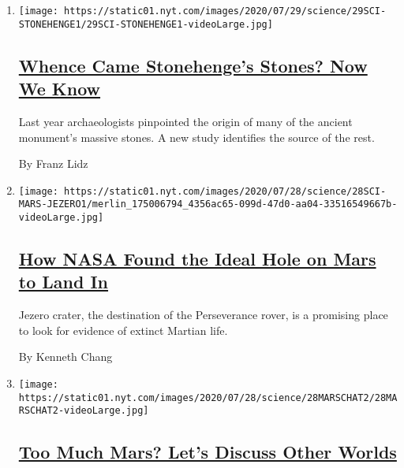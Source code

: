 \begin{enumerate}
\def\labelenumi{\arabic{enumi}.}
\item
  \texttt{[image: https://static01.nyt.com/images/2020/07/29/science/29SCI-STONEHENGE1/29SCI-STONEHENGE1-videoLarge.jpg]}

  \hypertarget{whence-came-stonehenges-stones-now-we-know}{%
  \subsection{\texorpdfstring{\href{/2020/07/29/science/stonehenge-archaeology-sarsens.html}{Whence
  Came Stonehenge's Stones? Now We
  Know}}{Whence Came Stonehenge's Stones? Now We Know}}\label{whence-came-stonehenges-stones-now-we-know}}

  Last year archaeologists pinpointed the origin of many of the ancient
  monument's massive stones. A new study identifies the source of the
  rest.

  By Franz Lidz
\item
  \texttt{[image: https://static01.nyt.com/images/2020/07/28/science/28SCI-MARS-JEZERO1/merlin\_175006794\_4356ac65-099d-47d0-aa04-33516549667b-videoLarge.jpg]}

  \hypertarget{how-nasa-found-the-ideal-hole-on-mars-to-land-in}{%
  \subsection{\texorpdfstring{\href{/2020/07/28/science/nasa-jezero-perseverance.html}{How
  NASA Found the Ideal Hole on Mars to Land
  In}}{How NASA Found the Ideal Hole on Mars to Land In}}\label{how-nasa-found-the-ideal-hole-on-mars-to-land-in}}

  Jezero crater, the destination of the Perseverance rover, is a
  promising place to look for evidence of extinct Martian life.

  By Kenneth Chang
\item
  \texttt{[image: https://static01.nyt.com/images/2020/07/28/science/28MARSCHAT2/28MARSCHAT2-videoLarge.jpg]}

  \hypertarget{too-much-mars-lets-discuss-other-worlds}{%
  \subsection{\texorpdfstring{\href{/2020/07/28/science/mars-nasa-science.html}{Too
  Much Mars? Let's Discuss Other
  Worlds}}{Too Much Mars? Let's Discuss Other Worlds}}\label{too-much-mars-lets-discuss-other-worlds}}


\end{enumerate}
